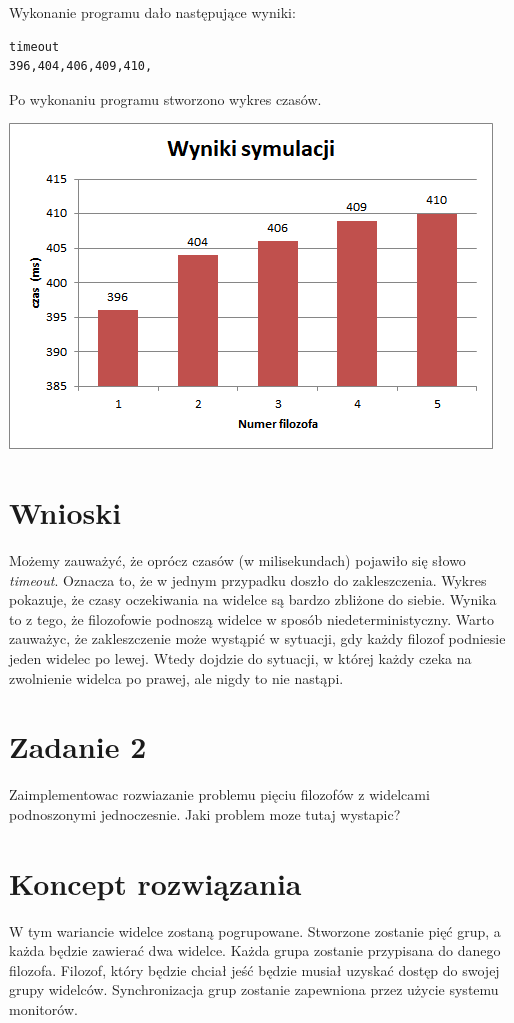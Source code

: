 \documentclass[12pt]{article}
\begin{document}
\newpage
\noindent
Wykonanie programu dało następujące wyniki:
\begin{verbatim}
timeout
396,404,406,409,410,
\end{verbatim}

\noindent
Po wykonaniu programu stworzono wykres czasów.
\begin{center}
\centering
    \includegraphics{philosophers_deadlock.png}
\end{center}


\section{Wnioski}
Możemy zauważyć, że oprócz czasów (w milisekundach) pojawiło się słowo \emph{timeout}. Oznacza to, że w jednym przypadku doszło do zakleszczenia. Wykres pokazuje, że czasy oczekiwania na widelce są bardzo zbliżone do siebie. Wynika to z tego, że filozofowie podnoszą widelce w sposób niedeterministyczny.
Warto zauważyc, że zakleszczenie może wystąpić w sytuacji, gdy każdy filozof podniesie jeden widelec po lewej. Wtedy dojdzie do sytuacji, w której każdy czeka na zwolnienie widelca po prawej, ale nigdy to nie nastąpi.



\newpage
\section{Zadanie 2}
Zaimplementowac rozwiazanie problemu pięciu filozofów z widelcami podnoszonymi jednoczesnie. Jaki problem moze tutaj wystapic?
  
\section{Koncept rozwiązania}
W tym wariancie widelce zostaną pogrupowane. Stworzone zostanie pięć grup, a każda będzie zawierać dwa widelce. Każda grupa zostanie przypisana do danego filozofa. Filozof, który będzie chciał jeść będzie musiał uzyskać dostęp do swojej grupy widelców. Synchronizacja grup zostanie zapewniona przez użycie systemu monitorów.
\end{document}
